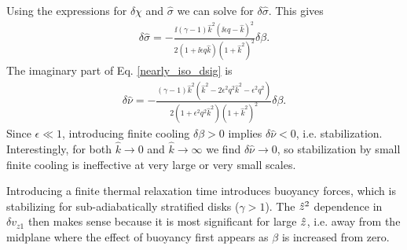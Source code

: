 Using the expressions for $\delta\chi$ and $\hat{\sigma}$ we can solve
for $\delta\hat{\sigma}$. This gives 
\begin{align}\label{nearly_iso_dsig}
  \delta \hat{\sigma} =
  -\frac{\ii\left(\gamma-1\right)\hat{k}^2\left(\ii\epsilon
      q - \hat{k}\right)^2}{2\left(1+\ii\epsilon q \hat{k}\right)\left(1+\hat{k}^2\right)^2}\delta\beta.
\end{align}
The imaginary part of Eq. \ref{nearly_iso_dsig} is
\begin{align}
  \delta\hat{\nu} =
  -\frac{\left(\gamma-1\right)\hat{k}^2 \left(\hat{k}^2 -
      2\epsilon^2q^2\hat{k}^2 - \epsilon^2q^2\right)}{2\left(1+\epsilon^2 q^2
      \hat{k}^2\right)\left(1+\hat{k}^2\right)^2}\delta\beta.  
\end{align}
Since $\epsilon \ll 1$, introducing finite cooling $\delta\beta>0$
implies $\delta\hat{\nu} < 0$, i.e. stabilization. Interestingly, for both
$\hat{k}\to0$ and $\hat{k}\to\infty$ we find $\delta\hat{\nu}\to0$, so
stabilization by small finite cooling is ineffective at very large or
very small scales. 



Introducing a finite thermal relaxation time introduces buoyancy
forces, which is stabilizing for sub-adiabatically stratified disks
($\gamma > 1$). The $\hat{z}^2$ dependence in $\delta v_{z1}$ then makes
sense because it is most significant for large $\hat{z}$, i.e. away from
the midplane where the effect of buoyancy first appears as $\beta$ is
increased from zero. 


